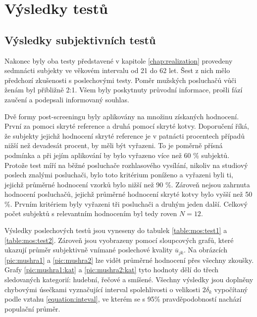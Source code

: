 \chapter{Výsledky testů}
\label{chap:results}

\section{Výsledky subjektivních testů}

Nakonec byly oba testy představené v kapitole \ref{chap:realization} provedeny sedmnácti subjekty ve věkovém intervalu od 21 do 62 let. Šest z nich mělo předchozí zkušenosti s poslechovými testy. Poměr mužských posluchačů vůči ženám byl přibližně 2:1. Všem byly poskytnuty průvodní informace, prošli fází zaučení a podepsali informovaný souhlas. 

Dvě formy post-screeningu byly aplikovány na množinu získaných hodnocení. První za pomoci skryté reference a druhá pomocí skryté kotvy. Doporučení říká, že subjekty jejichž hodnocení skryté reference je v patnácti procentech případů nižší než devadesát procent, by měli být vyřazeni. To je poměrně přísná podmínka a při jejím aplikování by bylo vyřazeno více než 60 \% subjektů. Protože test míří na běžné posluchače rozhlasového vysílání, nikoliv na studiový poslech znalými posluchači, bylo toto kritérium poníženo a vyřazeni byli ti, jejichž průměrné hodnocení vzorků bylo nižší než 90 \%. Zároveň nejsou zahrnuta hodnocení posluchačů, jejichž průměrné hodnocení skryté kotvy bylo vyšší než 50 \%. Prvním kritériem byly vyřazeni tři posluchači a druhým jeden další. Celkový počet subjektů s relevantním hodnocením byl tedy roven $N = 12$.

Výsledky poslechových testů jsou vyneseny do tabulek \ref{table:mos:test1} a \ref{table:mos:test2}. Zároveň jsou vyobrazeny pomocí sloupcových grafů, které ukazují průměr subjektivně vnímané poslechové kvality $\overline{u}_{jk}$. Na obrázcích \ref{pic:mushra1} a \ref{pic:mushra2} lze vidět průměrné hodnocení přes všechny zkoušky. Grafy \ref{pic:mushra1:kat} a \ref{pic:mushra2:kat} tyto hodnoty dělí do třech sledovaných kategorií: hudební, řečové a smíšené. Všechny výsledky jsou doplněny chybovými úsečkami vyznačující interval spolehlivosti o velikosti $2\delta_k$ vypočítaný podle vztahu \ref{equation:inteval}, ve kterém se s 95\% pravděpodobností nachází populační průměr. 

